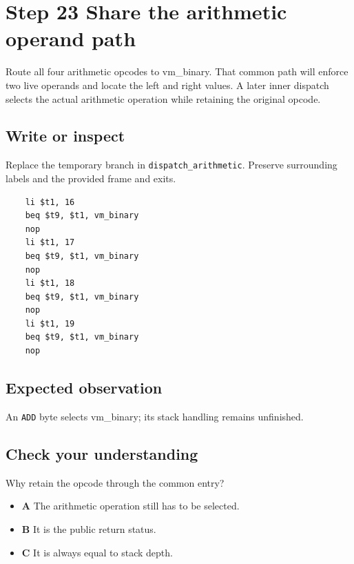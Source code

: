 \section{Step 23 Share the arithmetic operand path}\label{vm-s23}

Route all four arithmetic opcodes to vm\_binary. That common path will enforce two live operands and locate the left and right values. A later inner dispatch selects the actual arithmetic operation while retaining the original opcode.

\subsection{Write or inspect}
Replace the temporary branch in \texttt{dispatch\_arithmetic}. Preserve surrounding labels and the provided frame and exits.

\begin{verbatim}
    li $t1, 16
    beq $t9, $t1, vm_binary
    nop
    li $t1, 17
    beq $t9, $t1, vm_binary
    nop
    li $t1, 18
    beq $t9, $t1, vm_binary
    nop
    li $t1, 19
    beq $t9, $t1, vm_binary
    nop
\end{verbatim}
\subsection{Expected observation}
An \texttt{ADD} byte selects vm\_binary; its stack handling remains unfinished.

\subsection{Check your understanding}
Why retain the opcode through the common entry?

\begin{itemize}
  \item \textbf{A} The arithmetic operation still has to be selected.
  \item \textbf{B} It is the public return status.
  \item \textbf{C} It is always equal to stack depth.
\end{itemize}
